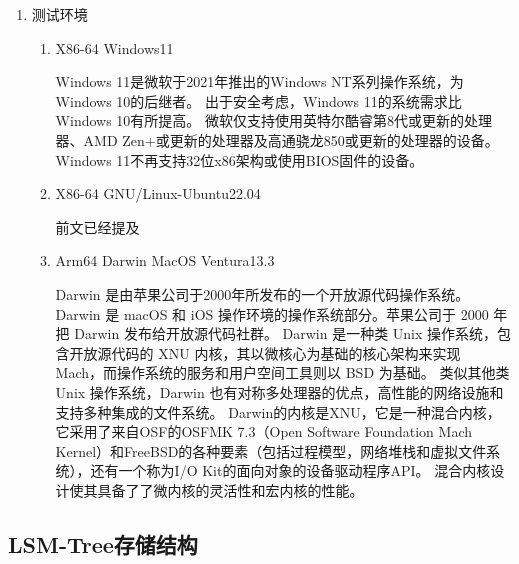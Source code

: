 \begin{enumerate}[fullwidth,itemindent=2em,listparindent=2em]
\begin{enumerate}
			\end{enumerate}
		\item 测试环境
			\begin{enumerate}
				\item {X86-64 Windows11}
				
				Windows 11是微软于2021年推出的Windows NT系列操作系统，为Windows 10的后继者。
				出于安全考虑，Windows 11的系统需求比Windows 10有所提高。
				微软仅支持使用英特尔酷睿第8代或更新的处理器、AMD Zen+或更新的处理器及高通骁龙850或更新的处理器的设备。
				Windows 11不再支持32位x86架构或使用BIOS固件的设备。
				
				\item X86-64 GNU/Linux-Ubuntu22.04
				
				前文已经提及
				\item Arm64 Darwin MacOS Ventura13.3
				
				Darwin 是由苹果公司于2000年所发布的一个开放源代码操作系统。Darwin 是 macOS 和 iOS 操作环境的操作系统部分。苹果公司于 2000 年把 Darwin 发布给开放源代码社群。
				Darwin 是一种类 Unix 操作系统，包含开放源代码的 XNU 内核，其以微核心为基础的核心架构来实现 Mach，而操作系统的服务和用户空间工具则以 BSD 为基础。
				类似其他类 Unix 操作系统，Darwin 也有对称多处理器的优点，高性能的网络设施和支持多种集成的文件系统。
				Darwin的内核是XNU，它是一种混合内核，它采用了来自OSF的OSFMK 7.3（Open Software Foundation Mach Kernel）和FreeBSD的各种要素（包括过程模型，网络堆栈和虚拟文件系统），还有一个称为I/O Kit的面向对象的设备驱动程序API。
				混合内核设计使其具备了了微内核的灵活性和宏内核的性能。
			\end{enumerate}
  
  	\end{enumerate}
     
    \subsection{LSM-Tree存储结构}
    

